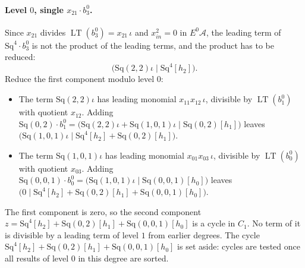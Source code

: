 \documentclass[11pt]{article}
\newcommand{\Sq}{\mathrm{Sq}}
\newcommand{\A}{\mathcal{A}}
\DeclareMathOperator{\LT}{LT}
\begin{document}
\paragraph{Level $0$, single $x_{21}\cdot b^{0}_{3}$.} Since $x_{21}$ divides $\LT(b^{0}_{3}) = x_{21}\,\iota$ and $x_{in}^2 = 0$ in $E^0\A$, the leading term of $\Sq^{4}\cdot b^{0}_{3}$ is not the product of the leading terms, and the product has to be reduced:
\[\bigl(\Sq(2,2)\iota \;\big|\; \Sq^{4}[h_2]\bigr).\]
Reduce the first component modulo level $0$:
\begin{itemize}
\item The term $\Sq(2,2)\iota$ has leading monomial $x_{11}x_{12}\,\iota$, divisible by $\LT(b^{0}_{1})$ with quotient $x_{12}$. Adding $\Sq(0,2)\cdot b^{0}_{1} = \bigl(\Sq(2,2)\iota + \Sq(1,0,1)\iota \;\big|\; \Sq(0,2)[h_1]\bigr)$ leaves $\bigl(\Sq(1,0,1)\iota \;\big|\; \Sq^{4}[h_2] + \Sq(0,2)[h_1]\bigr)$.
\item The term $\Sq(1,0,1)\iota$ has leading monomial $x_{01}x_{03}\,\iota$, divisible by $\LT(b^{0}_{0})$ with quotient $x_{03}$. Adding $\Sq(0,0,1)\cdot b^{0}_{0} = \bigl(\Sq(1,0,1)\iota \;\big|\; \Sq(0,0,1)[h_0]\bigr)$ leaves $\bigl(0 \;\big|\; \Sq^{4}[h_2] + \Sq(0,2)[h_1] + \Sq(0,0,1)[h_0]\bigr)$.
\end{itemize}
The first component is zero, so the second component $z = \Sq^{4}[h_2] + \Sq(0,2)[h_1] + \Sq(0,0,1)[h_0]$ is a cycle in $C_{1}$.
No term of it is divisible by a leading term of level $1$ from earlier degrees.
The cycle $\Sq^{4}[h_2] + \Sq(0,2)[h_1] + \Sq(0,0,1)[h_0]$ is set aside: cycles are tested once all results of level $0$ in this degree are sorted.
\medskip
\end{document}
